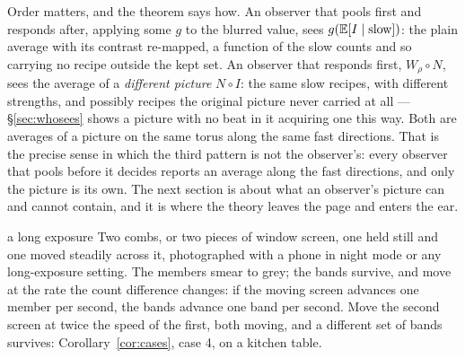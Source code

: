 Order matters, and the theorem says how. An observer that pools first and
responds after, applying some $g$ to the blurred value, sees
$g(\mathbb{E}[I\mid\text{slow}])$: the plain average with its contrast re-mapped, a
function of the slow counts and so carrying no recipe outside the kept
set. An observer that responds first, $W_\rho\circ N$, sees the average of
a \emph{different picture} $N\circ I$: the same slow recipes, with different
strengths, and possibly recipes the original picture never carried at all
--- \S\ref{sec:whosees} shows a picture with no beat in it acquiring one
this way. Both are averages of a picture on the same torus along the same
fast directions. That is the precise sense in which the third pattern is
not the observer's: every observer that pools before it decides reports an
average along the fast directions, and only the picture is its own. The
next section is about what an observer's picture can and cannot contain,
and it is where the theory leaves the page and enters the ear.

\begin{tryit}{a long exposure}
Two combs, or two pieces of window screen, one held still and one moved
steadily across it, photographed with a phone in night mode or any
long-exposure setting. The members smear to grey; the bands survive, and
move at the rate the count difference changes: if the moving screen
advances one member per second, the bands advance one band per second.
Move the second screen at twice the speed of the first, both moving, and a
different set of bands survives: Corollary~\ref{cor:cases}, case 4, on a
kitchen table.
\end{tryit}
